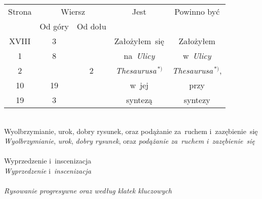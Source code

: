 \documentclass[a4paper,11pt]{article}
\numberwithin{equation}{section}
\begin{document}
\newpage



\begin{center}

  \begin{tabular}{|c|c|c|c|c|}
    \hline
    Strona & \multicolumn{2}{c|}{Wiersz} & Jest
    & Powinno być \\ \cline{2-3}
    & Od góry & Od dołu & & \\
    \hline
    XVIII & \hphantom{0}3 & & Założyłem~się & Założyłem \\
    \hphantom{0}1 & \hphantom{0}8 & & na~\textit{Ulicy} & w~\textit{Ulicy} \\
    \hphantom{0}2 & & \hphantom{0}2 & \textit{Thesaurusa}$^{ \, *) }$
    & \textit{Thesaurusa}$^{ \, *) }$, \\
    10 & 19 & & w~jej & przy \\
    19 & \hphantom{0}3 & & syntezą & syntezy \\
    \hline
  \end{tabular}

\end{center}

\VerSpaceTwo


\noindent
{} \\
\Jest Wyolbrzymianie, urok, dobry rysunek, oraz podążanie za~ruchem
i~zazębienie~się \\
\PowinnoByc \textit{Wyolbrzymianie}, \textit{urok}, \textit{dobry rysunek},
oraz \textit{podążanie za~ruchem i~zazębienie~się} \\
 \\
\Jest Wyprzedzenie i~inscenizacja \\
\PowinnoByc \textit{Wyprzedzenie} i~\textit{inscenizacja} \\
 \\
\Jest \textit{Rysowanie progresywne oraz według klatek kluczowych} \\












\printbibliography





\end{document}
